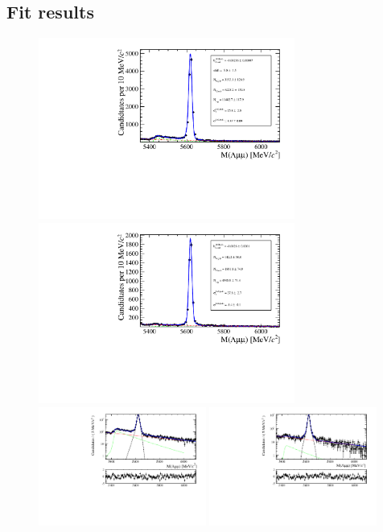 \subsection{Fit results}



\begin{figure}
\centering
\includegraphics[width=0.75\textwidth]{Lmumu/figs/MassFits/Lb2JpsiL__DD_data.pdf}
\includegraphics[width=0.75\textwidth]{Lmumu/figs/MassFits/Lb2JpsiL__LL_data.pdf}
\includegraphics[width=0.49\textwidth]{Lmumu/figs/MassFits/Lb2JpsiL_DD_data_log_fitAndRes.pdf}
\includegraphics[width=0.49\textwidth]{Lmumu/figs/MassFits/Lb2JpsiL_LL_data_log_fitAndRes.pdf}

\end{figure}

